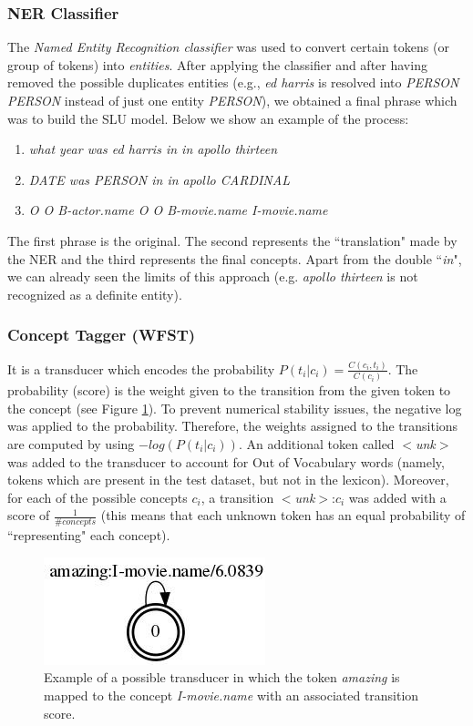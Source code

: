 \documentclass[11pt,a4paper]{article}
\begin{document}
\subsubsection{NER Classifier}

The \textit{Named Entity Recognition classifier} was used to convert certain tokens (or group of tokens) into \textit{entities}. After applying the classifier and after having removed the possible duplicates entities (e.g., \textit{ed harris} is resolved into \textit{PERSON PERSON} instead of just one entity \textit{PERSON}), we obtained a final phrase which was to build the SLU model. Below we show an example of the process:

\begin{enumerate}[noitemsep]
\item \textit{what year was ed harris in in apollo thirteen}
\item \textit{DATE was PERSON in in apollo CARDINAL}
\item \textit{O O B-actor.name O O B-movie.name I-movie.name}
\end{enumerate}

The first phrase is the original. The second represents the ``translation" made by the NER and the third represents the final concepts. Apart from the double ``\textit{in}", we can already seen the limits of this approach (e.g. \textit{apollo thirteen} is not recognized as a definite entity). 

\subsubsection{Concept Tagger (WFST)}
It is a transducer which encodes the probability $P(t_i|c_i) = \frac{C(c_i, t_i)}{C(c_i)}$. The probability (score) is the weight given to the transition from the given token to the concept (see Figure \ref{fig:transducer}). To prevent numerical stability issues, the negative log was applied to the probability. Therefore, the weights assigned to the transitions are computed by using $-log(P(t_i|c_i))$. An additional token called $<$\textit{unk}$>$ was added to the transducer to account for Out of Vocabulary words (namely, tokens which are present in the test dataset, but not in the lexicon). Moreover, for each of the possible concepts $c_i$, a transition $<$\textit{unk}$>$:$c_i$ was added with a score of $\frac{1}{\#concepts}$ (this means that each unknown token has an equal probability of ``representing" each concept). 

\begin{figure}[b!]
	\centering
	\includegraphics[width=0.5\linewidth]{img/pos-tagger}
	\caption{Example of a possible transducer in which the token \textit{amazing} is mapped to the concept \textit{I-movie.name} with an associated transition score.}
	\label{fig:transducer}
\end{figure}
\end{document}
